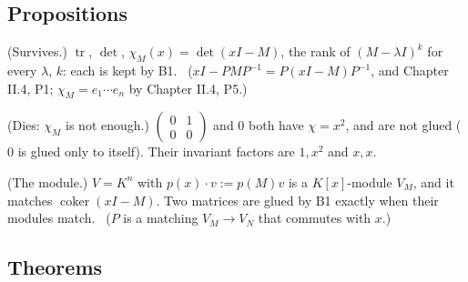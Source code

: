 \subsection*{Propositions}

\begin{lines}
\item[\lab{P1}] (Survives.) $\operatorname{tr}$, $\det$, $\chi_M(x) = \det(xI - M)$, the rank of $(M - \lambda I)^k$ for every $\lambda$, $k$: each is kept by B1. \ ($xI - PMP^{-1} = P(xI - M)P^{-1}$, and Chapter II.4, P1; $\chi_M = e_1 \cdots e_n$ by Chapter II.4, P5.)
\item[\lab{P2}] (Dies: $\chi_M$ is not enough.) $\begin{pmatrix} 0 & 1 \\ 0 & 0 \end{pmatrix}$ and $0$ both have $\chi = x^2$, and are not glued ($0$ is glued only to itself). Their invariant factors are $1, x^2$ and $x, x$.
\item[\lab{P3}] (The module.) $V = K^n$ with $p(x) \cdot v := p(M)v$ is a $K[x]$-module $V_M$, and it matches $\operatorname{coker}(xI - M)$. Two matrices are glued by B1 exactly when their modules match. \ ($P$ is a matching $V_M \to V_N$ that commutes with $x$.)
\end{lines}

\subsection*{Theorems}

